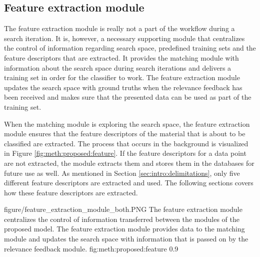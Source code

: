 \subsection{Feature extraction module}
\label{sec:method:proposed:features}
The feature extraction module is really not a part of the workflow during a search iteration. It is, however, a necessary supporting module that centralizes the control of information regarding search space, predefined training sets and the feature descriptors that are extracted. It provides the matching module with information about the search space during search iterations and delivers a training set in order for the classifier to work. The feature extraction module updates the search space with ground truths when the relevance feedback has been received and makes sure that the presented data can be used as part of the training set.

When the matching module is exploring the search space, the feature extraction module ensures that the feature descriptors of the material that is about to be classified are extracted. The process that occurs in the background is visualized in Figure \ref{fig:meth:proposed:feature}. If the feature descriptors for a data point are not extracted, the module extracts them and stores them in the databases for future use as well. As mentioned in Section \ref{sec:intro:delimitations}, only five different feature descriptors are extracted and used. 
The following sections covers how these feature descriptors are extracted. 


\singlefigure
{figure/feature_extraction_module_both.PNG}
{The feature extraction module centralizes the control of information transferred between the modules of the proposed model. The feature extraction module provides data to the matching module and updates the search space with information that is passed on by the relevance feedback module.}
{fig:meth:proposed:feature}
{0.9}





